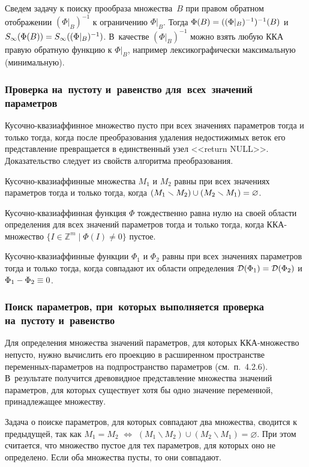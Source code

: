 \begin{multicols}{2}
Сведем задачу к поиску прообраза множества~$B$ при правом обратном
отображении $(\Phi|_B)^{-1}$ к ограничению $\Phi|_B$. Тогда
$\Phi(B)\hm=((\Phi|_B)^{-1})^{-1}(B)$ и $S_\infty(\Phi(B)) \hm=
S_\infty((\Phi|_B)^{-1})$. В~качестве $(\Phi|_B)^{-1}$ можно взять
любую ККА правую обратную функцию к $\Phi|_B$,
например лексикографически максимальную (минимальную).

\subsubsection{Проверка на~пустоту и~равенство для~всех~значений
параметров} %

Кусочно-квазиаффинное множество пусто при всех значениях параметров тогда и только
тогда, когда после преобразования удаления недостижимых веток его
пред\-став\-ле\-ние превращается в единственный узел <<return NULL>>.
Доказательство следует из свойств алгоритма преобразования.

Кусочно-квазиаффинные множества $M_1$ и $M_2$ равны при всех значениях параметров
тогда и только тогда, когда $(M_1\smallsetminus
M_2)\cup(M_2\smallsetminus M_1)\hm=\varnothing$.

Кусочно-квазиаффинная функция $\Phi$ тождественно равна нулю на своей области
определения для всех значений параметров тогда и только тогда, когда
ККА-мно\-жест\-во $\{ I\in\mathbb{Z}^m \mid \Phi(I) \neq 0\}$ пустое.

Кусочно-квазиаффинные функции $\Phi_1$ и $\Phi_2$ равны при всех значениях па\-ра\-мет\-ров
тогда и только тогда, когда совпадают их области определения ${\cal D}(\Phi_1)\hm=
{\cal D}(\Phi_2)$ и $\Phi_1\hm-\Phi_2\hm\equiv0$.


\subsubsection{Поиск параметров, при~которых выполняется проверка 
на~пустоту и~равенство} %

Для определения множества значений па\-ра\-мет\-ров, для которых
ККА-множество непусто, нужно вычислить его проекцию в расширенном
пространстве пе\-ре\-мен\-ных-па\-ра\-мет\-ров на подпространство па\-ра\-мет\-ров
(см.\ п.~4.2.6). В~результате получится древовидное пред\-став\-ле\-ние
множества значений параметров, для которых существует хотя бы одно
значение переменной, принадлежащее множеству.

Задача о поиске па\-ра\-мет\-ров, для которых совпадают два множества,
сводится к предыдущей, так как $M_1=M_2$  $\Leftrightarrow$ 
$(M_1 \smallsetminus M_2)\cup(M_2 \smallsetminus
M_1)=\varnothing$. При этом считается, что множество пустое для
тех па\-ра\-мет\-ров, для которых оно не определено. Если оба множества
пус\-ты, то они совпадают.


\end{multicols}

